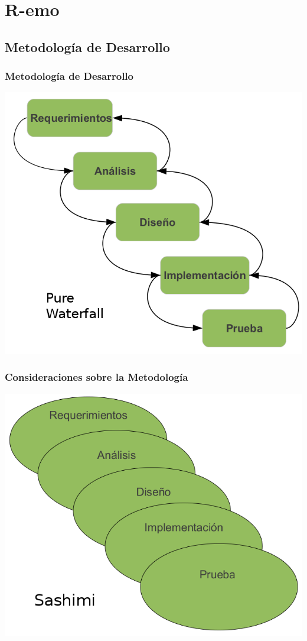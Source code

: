 \section{R-emo}
  \subsection{Metodología de Desarrollo}
      \begin{frame}\frametitle{\textbf{Metodología de Desarrollo}}
          \begin{center}
            \includegraphics[scale=.4]{images/cascadaPuro.png}
          \end{center}
      \end{frame}  
      
      \begin{frame}\frametitle{\textbf{Consideraciones sobre la Metodología}}
          \begin{center}  
            \includegraphics[scale=.42]{images/sashimi2.png}
          \end{center}
      \end{frame}  

